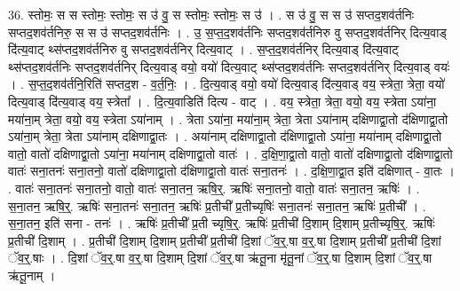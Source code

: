 \documentclass[17pt]{extarticle}
\begin{document}
36. स्तोमः॒ स स स्तोमः॒ स्तोमः॒ स उ॑ वु॒ स स्तोमः॒ स्तोमः॒ स उ॑ । . स उ॑ वु॒ स स उ॑ सप्तद॒शव॑र्तनिः सप्तद॒शव॑र्तनिरु॒ स स उ॑ सप्तद॒शव॑र्तनिः । . उ॒ स॒प्त॒द॒शव॑र्तनिः सप्तद॒शव॑र्तनिरु वु सप्तद॒शव॑र्तनिर् दित्य॒वाड् दि॑त्य॒वाट् थ्स॑प्तद॒शव॑र्तनिरु वु सप्तद॒शव॑र्तनिर् दित्य॒वाट् । . स॒प्त॒द॒शव॑र्तनिर् दित्य॒वाड् दि॑त्य॒वाट् थ्स॑प्तद॒शव॑र्तनिः सप्तद॒शव॑र्तनिर् दित्य॒वाड् वयो॒ वयो॑ दित्य॒वाट् थ्स॑प्तद॒शव॑र्तनिः सप्तद॒शव॑र्तनिर् दित्य॒वाड् वयः॑ । . स॒प्त॒द॒शव॑र्तनि॒रिति॑ सप्तद॒श - व॒र्त॒निः॒ । . दि॒त्य॒वाड् वयो॒ वयो॑ दित्य॒वाड् दि॑त्य॒वाड् वय॒ स्त्रेता॒ त्रेता॒ वयो॑ दित्य॒वाड् दि॑त्य॒वाड् वय॒ स्त्रेता᳚ । . दि॒त्य॒वाडिति॑ दित्य - वाट् । . वय॒ स्त्रेता॒ त्रेता॒ वयो॒ वय॒ स्त्रेता ऽया॑ना॒ मया॑ना॒म् त्रेता॒ वयो॒ वय॒ स्त्रेता ऽया॑नाम् । . त्रेता ऽया॑ना॒ मया॑ना॒म् त्रेता॒ त्रेता ऽया॑नाम् दक्षिणाद्वा॒तो द॑क्षिणाद्वा॒तो ऽया॑ना॒म् त्रेता॒ त्रेता ऽया॑नाम् दक्षिणाद्वा॒तः । . अया॑नाम् दक्षिणाद्वा॒तो द॑क्षिणाद्वा॒तो ऽया॑ना॒ मया॑नाम् दक्षिणाद्वा॒तो वातो॒ वातो॑ दक्षिणाद्वा॒तो ऽया॑ना॒ मया॑नाम् दक्षिणाद्वा॒तो वातः॑ । . द॒क्षि॒णा॒द्वा॒तो वातो॒ वातो॑ दक्षिणाद्वा॒तो द॑क्षिणाद्वा॒तो वातः॑ सना॒तनः॑ सना॒तनो॒ वातो॑ दक्षिणाद्वा॒तो द॑क्षिणाद्वा॒तो वातः॑ सना॒तनः॑ । . द॒क्षि॒णा॒द्वा॒त इति॑ दक्षिणात् - वा॒तः । . वातः॑ सना॒तनः॑ सना॒तनो॒ वातो॒ वातः॑ सना॒तन॒ ऋषि॒र्॒. ऋषिः॑ सना॒तनो॒ वातो॒ वातः॑ सना॒तन॒ ऋषिः॑ । . स॒ना॒तन॒ ऋषि॒र्॒. ऋषिः॑ सना॒तनः॑ सना॒तन॒ ऋषिः॑ प्र॒तीची᳚ प्र॒तीच्यृषिः॑ सना॒तनः॑ सना॒तन॒ ऋषिः॑ प्र॒तीची᳚ । . स॒ना॒तन॒ इति॑ सना - तनः॑ । . ऋषिः॑ प्र॒तीची᳚ प्र॒ती च्यृषि॒र्॒. ऋषिः॑ प्र॒तीची॑ दि॒शाम् दि॒शाम् प्र॒तीच्यृषि॒र्॒. ऋषिः॑ प्र॒तीची॑ दि॒शाम् । . प्र॒तीची॑ दि॒शाम् दि॒शाम् प्र॒तीची᳚ प्र॒तीची॑ दि॒शां ॅव॒र्॒.षा व॒र्॒.षा दि॒शाम् प्र॒तीची᳚ प्र॒तीची॑ दि॒शां ॅव॒र्॒.षाः । . दि॒शां ॅव॒र्॒.षा व॒र्॒.षा दि॒शाम् दि॒शां ॅव॒र्॒.षा ऋ॑तू॒ना मृ॑तू॒नां ॅव॒र्॒.षा दि॒शाम् दि॒शां ॅव॒र्॒.षा ऋ॑तू॒नाम् । \newline
\end{document}
